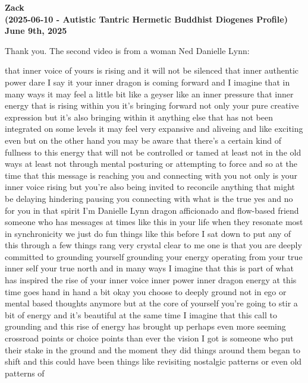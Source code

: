 \documentclass{article}
\begin{document}
\begin{center}
\textbf{Zack} \\
\textbf{(2025-06-10 - Autistic Tantric Hermetic Buddhist Diogenes Profile)} \\
\textbf{June 9th, 2025}
\end{center}



Thank you. The second video is from a woman Ned Danielle Lynn:

that inner voice of yours is rising and it will not be silenced that
inner authentic power dare I say it your inner dragon is coming forward
and I imagine that in many ways it may feel a little bit like a geyser
like an inner pressure that inner energy that is rising within you it's
bringing forward not only your pure creative expression but it's also
bringing within it anything else that has not been integrated on some
levels it may feel very expansive and aliveing and like exciting even
but on the other hand you may be aware that there's a certain kind of
fullness to this energy that will not be controlled or tamed at least
not in the old ways at least not through mental posturing or attempting
to force and so at the time that this message is reaching you and
connecting with you not only is your inner voice rising but you're also
being invited to reconcile anything that might be delaying hindering
pausing you connecting with what is the true yes and no for you in that
spirit I'm Danielle Lynn dragon afficionado and flow-based friend
someone who has messages at times like this in your life when they
resonate most in synchronicity we just do fun things like this before I
sat down to put any of this through a few things rang very crystal clear
to me one is that you are deeply committed to grounding yourself
grounding your energy operating from your true inner self your true
north and in many ways I imagine that this is part of what has inspired
the rise of your inner voice inner power inner dragon energy at this
time goes hand in hand a bit okay you choose to deeply ground not in ego
or mental based thoughts anymore but at the core of yourself you're
going to stir a bit of energy and it's beautiful at the same time I
imagine that this call to grounding and this rise of energy has brought
up perhaps even more seeming crossroad points or choice points than ever
the vision I got is someone who put their stake in the ground and the
moment they did things around them began to shift and this could have
been things like revisiting nostalgic patterns or even old patterns of
\end{document}
